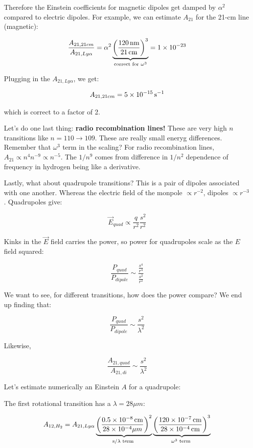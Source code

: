 \documentclass{article}
\newcommand{\unit}[1]{{\,\rm #1}}
\newcommand{\be}{\begin{equation}}
\newcommand{\ee}{\end{equation}}
\newcommand{\s}{\unit{s}}
\newcommand{\cm}{\unit{cm}}
\newcommand{\nm}{\unit{nm}}
\begin{document}
Therefore the Einstein coefficients for magnetic dipoles get damped by $\alpha^2$ compared to electric dipoles. For example, we can estimate $A_{21}$ for the 21-cm line (magnetic):

\begin{equation}
    \frac{A_{21,21cm}}{A_{21,Ly\alpha}} = \alpha^2 \underbrace{\left(\frac{120 \nm}{ 21 \cm}\right)^3}_{\text{correct for } \omega^3} = 1\times 10^{-23} 
\end{equation}

Plugging in the $A_{21,Ly\alpha}$, we get:

\be
A_{21,21cm} = 5\times10^{-15} \s^{-1}
\ee

which is correct to a factor of 2. 

Let's do one last thing: \textbf{radio recombination lines!} These are very high $n$ transitions like $n=110 \rightarrow 109$. These are really small eneryg differences. Remember that $\omega^3$ term in the scaling? For radio recombination lines, $A_{21} \propto n^4 n^{-9} \propto n^{-5}$. The $1/n^9$ comes from difference in $1/n^2$ dependence of frequency in hydrogen being like a derivative.

Lastly, what about quadrupole transitions? This is a pair of dipoles associated with one another. Whereas the electric field of the monpole $\propto r^{-2}$, dipoles $\propto r^{-3}$. Quadrupoles give:

\be
\vec{E}_{quad} \propto \frac{q}{r^2}\frac{s^2}{r^2}
\ee

Kinks in the $\vec{E}$ field carries the power, so power for quadrupoles scale as the $E$ field squared:

\be
\frac{P_{quad}}{P_{dipole}} \sim \frac{\frac{s^4}{r^4}}{\frac{s^2}{r^2}}
\ee

We want to see, for different transitions, how does the power compare? We end up finding that: 

\be
\frac{P_{quad}}{P_{dipole}} \sim \frac{s^2}{\lambda^2}
\ee

Likewise, 

\be
\frac{A_{21,quad}}{A_{21,di}}\sim \frac{s^2}{\lambda^2}
\ee

Let's estimate numerically an Einstein $A$ for a quadrupole:

The first rotational transition has a $\lambda = 28 \mu m$:

\be
A_{12,H_2} = A_{21,Ly\alpha} \underbrace{\left(\frac{0.5 \times 10^{-8} \cm}{28 \times 10^{-4} \mu m}\right)^2}_{\text{s/}\lambda \text{ term }} \underbrace{\left(\frac{120 \times 10^{-7} \cm}{28 \times 10^{-4} \cm}\right)^{3}}_{\omega^3 \text{ term }}
\ee
\end{document}
